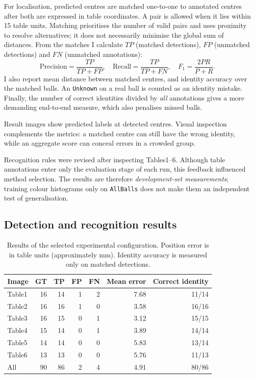 \documentclass[12pt,a4paper]{article}
\begin{document}
For localisation, predicted centres are matched one-to-one to annotated centres after both are expressed in table coordinates. A pair is allowed when it lies within 15 table units. Matching prioritises the number of valid pairs and uses proximity to resolve alternatives; it does not necessarily minimise the global sum of distances. From the matches I calculate $TP$ (matched detections), $FP$ (unmatched detections) and $FN$ (unmatched annotations):
\vspace{0pt}
\[\mathrm{Precision}=\frac{TP}{TP+FP},\quad \mathrm{Recall}=\frac{TP}{TP+FN},\quad F_1=\frac{2PR}{P+R}.\]
\vspace{-2pt}
I also report mean distance between matched centres, and identity accuracy over the matched balls. An \texttt{Unknown} on a real ball is counted as an identity mistake. Finally, the number of correct identities divided by \emph{all} annotations gives a more demanding end-to-end measure, which also penalises missed balls.

Result images show predicted labels at detected centres. Visual inspection complements the metrics: a matched centre can still have the wrong identity, while an aggregate score can conceal errors in a crowded group.

Recognition rules were revised after inspecting Tables1--6. Although table annotations enter only the evaluation stage of each run, this feedback influenced method selection. The results are therefore \emph{development-set measurements}; training colour histograms only on \texttt{AllBalls} does not make them an independent test of generalisation.

\subsection{Detection and recognition results}
\begin{table}[H]\centering\small
\caption{Results of the selected experimental configuration. Position error is in table units (approximately mm). Identity accuracy is measured only on matched detections.}
\begin{tabular}{lrrrrrr}
\toprule
Image & GT & TP & FP & FN & Mean error & Correct identity\\
\midrule
Table1 &16&14&1&2&7.68&11/14\\
Table2 &16&16&1&0&3.58&16/16\\
Table3 &16&15&0&1&3.12&15/15\\
Table4 &15&14&0&1&3.89&14/14\\
Table5 &14&14&0&0&5.83&13/14\\
Table6 &13&13&0&0&5.76&11/13\\
\midrule
All &90&86&2&4&4.91&80/86\\
\bottomrule
\end{tabular}
\end{table}
\end{document}
